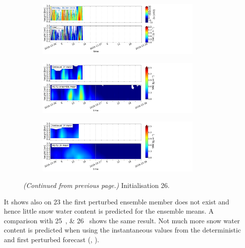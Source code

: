\begin{figure}[H]\ContinuedFloat
	\centering
	\begin{subfigure}[t]{\textwidth}
		\centering
		\includegraphics[trim={0.cm 2.2cm 19.cm 0.5cm},clip,width=0.9\textwidth]{./fig_obs_ret/20161226}
		\caption{}\label{fig:SWC:ret_26}
	\end{subfigure}
	\begin{subfigure}[t]{\textwidth}
		\centering
		\includegraphics[trim={0.cm 2.2cm 19.cm 0.5cm},clip,width=0.9\textwidth]{./fig_vert_SWC_EM/20161226}
		\caption{}\label{fig:SWC_EM:26}
	\end{subfigure}
	\begin{subfigure}[t]{\textwidth}
		\centering
		\includegraphics[trim={0.cm 0.8cm 19.cm 0.5cm},clip,width=0.9\textwidth]{./fig_vert_SWC_3h/20161226}
		\caption{}\label{fig:SWC3h:26}
	\end{subfigure}
	\caption{\textit{(Continued from previous page.)} Initialisation \SI{26}{\dec}.}
\end{figure}
\noindent
It shows also on \SI{23}{\dec} the first perturbed ensemble member does not exist and hence little snow water content is predicted for the ensemble means. 
A comparison with \SIlist{25;26}{\dec} shows the same result. Not much more snow water content is predicted when using the instantaneous values from the deterministic and first perturbed forecast (, ). 
